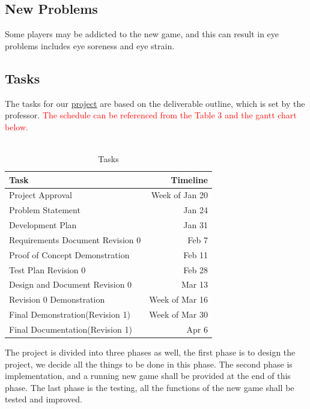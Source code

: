 \documentclass[12pt, titlepage]{article}
\begin{document}
\subsection{New Problems}
Some players may be addicted to the new game, and this can result in eye problems includes eye soreness and eye strain.
\subsection{Tasks}
The tasks for our \underline{project} are based on the deliverable outline, which is set by the professor. \textcolor{red}{The schedule can be referenced from the Table 3 and the gantt chart below.}\\
\\

\begin{table}[H]
\caption{Tasks}
\begin{center}
\begin{tabular}{|l|r|}
\hline
Task & Timeline\\
\hline
Project Approval & Week of Jan 20\\
\hline
Problem Statement & Jan 24\\
\hline
Development Plan & Jan 31\\
\hline
Requirements Document Revision 0 & Feb 7\\
\hline
Proof of Concept Demonstration & Feb 11\\
\hline
Test Plan Revision 0 & Feb 28\\
\hline
Design and Document Revision 0 & Mar 13\\
\hline
Revision 0 Demonstration & Week of Mar 16\\
\hline
Final Demonstration(Revision 1) & Week of Mar 30\\
\hline
Final Documentation(Revision 1) & Apr 6\\
\hline
\end{tabular}
\end{center}
\label{default}
\end{table}%

The project is divided into three phases as well, the first phase is to design the project, we decide all the things to be done in this phase. The second phase is implementation, and a running new game shall be provided at the end of this phase. The last phase is the testing, all the functions of the new game shall be tested and improved.\\
\end{document}
